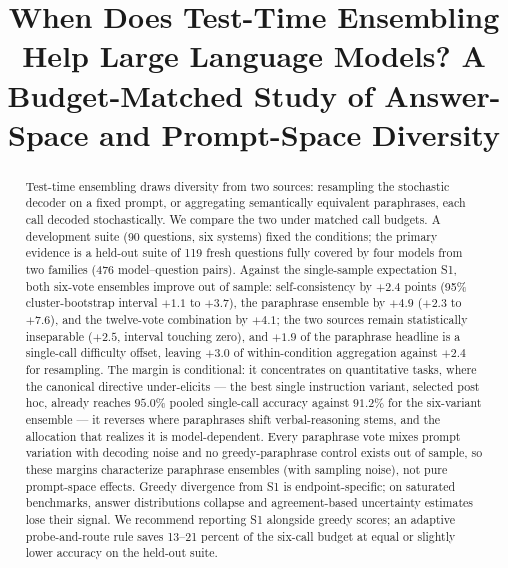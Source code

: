 \documentclass[10pt]{article}
\title{When Does Test-Time Ensembling Help Large Language Models? A Budget-Matched Study of Answer-Space and Prompt-Space Diversity}
\author{
}
\begin{document}
\maketitle

\begin{abstract}
\noindent
Test-time ensembling draws diversity from two sources: resampling the stochastic decoder on a fixed prompt, or aggregating semantically equivalent paraphrases, each call decoded stochastically. We compare the two under matched call budgets. A development suite (90 questions, six systems) fixed the conditions; the primary evidence is a held-out suite of 119 fresh questions fully covered by four models from two families (476 model--question pairs). Against the single-sample expectation S1, both six-vote ensembles improve out of sample: self-consistency by $+2.4$ points (95\% cluster-bootstrap interval $+1.1$ to $+3.7$), the paraphrase ensemble by $+4.9$ ($+2.3$ to $+7.6$), and the twelve-vote combination by $+4.1$; the two sources remain statistically inseparable ($+2.5$, interval touching zero), and $+1.9$ of the paraphrase headline is a single-call difficulty offset, leaving $+3.0$ of within-condition aggregation against $+2.4$ for resampling. The margin is conditional: it concentrates on quantitative tasks, where the canonical directive under-elicits --- the best single instruction variant, selected post hoc, already reaches $95.0\%$ pooled single-call accuracy against $91.2\%$ for the six-variant ensemble --- it reverses where paraphrases shift verbal-reasoning stems, and the allocation that realizes it is model-dependent. Every paraphrase vote mixes prompt variation with decoding noise and no greedy-paraphrase control exists out of sample, so these margins characterize paraphrase ensembles (with sampling noise), not pure prompt-space effects. Greedy divergence from S1 is endpoint-specific; on saturated benchmarks, answer distributions collapse and agreement-based uncertainty estimates lose their signal. We recommend reporting S1 alongside greedy scores; an adaptive probe-and-route rule saves 13--21 percent of the six-call budget at equal or slightly lower accuracy on the held-out suite.
\end{abstract}









\end{document}
